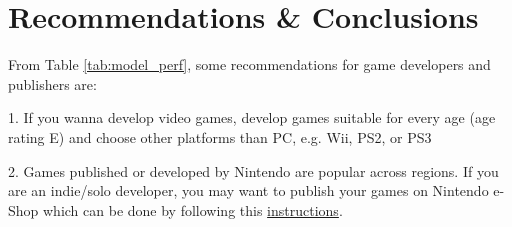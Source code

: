 \documentclass[12pt]{article}
\begin{document}


\section{Recommendations \& Conclusions}

From Table \ref{tab:model_perf}, some recommendations for game developers and publishers are:

1. If you wanna develop video games, develop games suitable for every age (age rating E) and choose other platforms than PC, e.g. Wii, PS2, or PS3

2. Games published or developed by Nintendo are popular across regions. If you are an indie/solo developer, you may want to publish your games on Nintendo e-Shop which can be done by following this \href{https://developer.nintendo.com/the-process}{instructions}.
\end{document}
